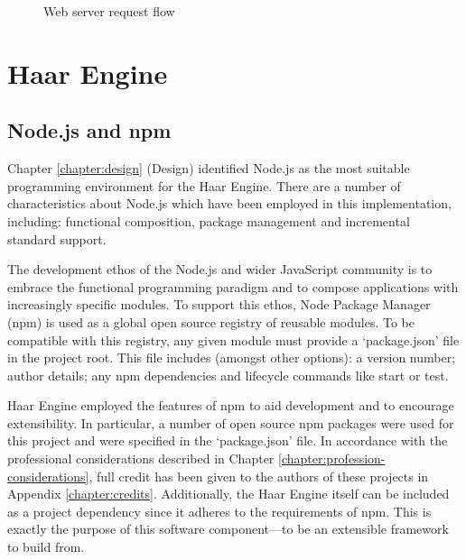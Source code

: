    \begin{figure}
      \centering
      \caption{Web server request flow}
      \label{figure:reverse-proxy}
    \end{figure}

  \section{Haar Engine}

    \subsection{Node.js and npm}
      Chapter \ref{chapter:design} (Design) identified Node.js as the most suitable programming environment for the Haar Engine. There are a number of characteristics  about Node.js which have been employed in this implementation, including: functional composition, package management and incremental standard support.

      The development ethos of the Node.js and wider JavaScript community is to embrace the functional programming paradigm and to compose applications with increasingly specific modules. To support this ethos, Node Package Manager (npm) is used as a global open source registry of reusable modules. To be compatible with this registry, any given module must provide a `package.json' file in the project root. This file includes (amongst other options): a version number; author details; any npm dependencies and lifecycle commands like start or test.

      Haar Engine employed the features of npm to aid development and to encourage extensibility. In particular, a number of open source npm packages were used for this project and were specified in the `package.json' file. In accordance with the professional considerations described in Chapter \ref{chapter:profession-considerations}, full credit has been given to the authors of these projects in Appendix \ref{chapter:credits}. Additionally, the Haar Engine itself can be included as a project dependency since it adheres to the requirements of npm. This is exactly the purpose of this software component---to be an extensible framework to build from.

